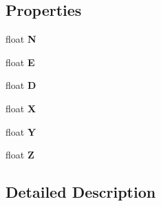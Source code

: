 \subsection*{Properties}
\begin{DoxyCompactItemize}
\item 
\hypertarget{class_example_1_1_vector_a91797e953010f556b85a7173e644d957}{}float {\bfseries N}\label{class_example_1_1_vector_a91797e953010f556b85a7173e644d957}

\item 
\hypertarget{class_example_1_1_vector_aa0495aefcfa8d8ec5bdd147a91de8571}{}float {\bfseries E}\label{class_example_1_1_vector_aa0495aefcfa8d8ec5bdd147a91de8571}

\item 
\hypertarget{class_example_1_1_vector_a66424f9c546909c67d9697d7546d525f}{}float {\bfseries D}\label{class_example_1_1_vector_a66424f9c546909c67d9697d7546d525f}

\item 
\hypertarget{class_example_1_1_vector_a93704a1572edef07ab0a97d2c49f31ed}{}float {\bfseries X}\label{class_example_1_1_vector_a93704a1572edef07ab0a97d2c49f31ed}

\item 
\hypertarget{class_example_1_1_vector_ab46c21e0af1a734923c4124b3d62353f}{}float {\bfseries Y}\label{class_example_1_1_vector_ab46c21e0af1a734923c4124b3d62353f}

\item 
\hypertarget{class_example_1_1_vector_a1d9fa339dc2741d619f11cfb1d7f99d8}{}float {\bfseries Z}\label{class_example_1_1_vector_a1d9fa339dc2741d619f11cfb1d7f99d8}

\end{DoxyCompactItemize}


\subsection{Detailed Description}


